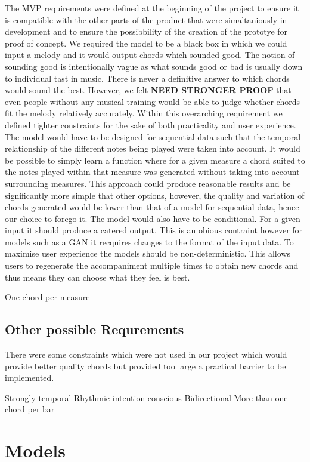 The MVP requirements were defined at the beginning of the project to ensure it is compatible with the other parts of the product that were simaltaniously in development and to ensure the possibbility of the creation of the prototye for proof of concept. 
We required the model to be a black box in which we could input a melody and it would output chords which sounded good.
The notion of sounding good is intentionally vague as what sounds good or bad is usually down to individual tast in music.
There is never a definitive answer to which chords would sound the best.
However, we felt \textbf{NEED STRONGER PROOF} that even people without any musical training would be able to judge whether chords fit the melody relatively accurately.
Within this overarching requirement we defined tighter constraints for the sake of both practicality and user experience. 
The model would have to be designed for sequential data such that the temporal relationship of the different notes being played were taken into account.
It would be possible to simply learn a function where for a given measure a chord suited to the notes played within that measure was generated without taking into account surrounding measures.
This approach could produce reasonable results and be significantly more simple that other options, however, the quality and variation of chords generated would be lower than that of a model for sequential data, hence our choice to forego it.
The model would also have to be conditional. For a given input it should produce a catered output. This is an obious contraint however for models such as a GAN it recquires changes to the format of the input data.
To maximise user experience the models should be non-deterministic. This allows users to regenerate the accompaniment multiple times to obtain new chords and thus means they can choose what they feel is best.

One chord per measure
\subsection{Other possible Requrements}

There were some constraints which were not used in our project which would provide better quality chords but provided too large a practical barrier to be implemented.

Strongly temporal
Rhythmic intention conscious
Bidirectional
More than one chord per bar
\section{Models}


